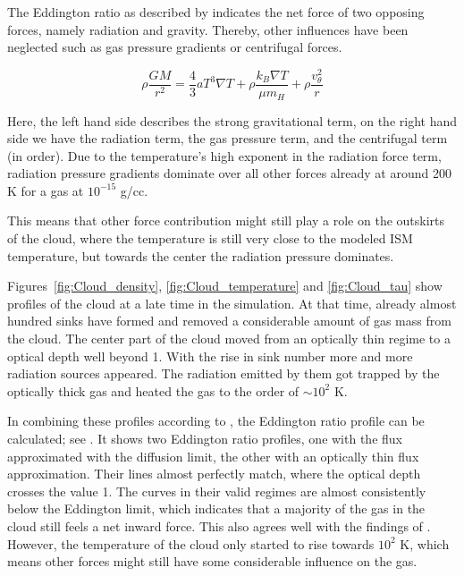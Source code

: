 The Eddington ratio as described by  indicates the net force of two opposing forces, namely radiation and gravity.
Thereby, other influences have been neglected such as gas pressure gradients or centrifugal forces.

\begin{equation}
  \rho \frac{GM}{r^{2}} = \frac{4}{3}a T^{3}\nabla T + \rho \frac{k_{B} \nabla T}{\mu m_{H}} + \rho \frac{v_{\theta}^{2}}{r}
\end{equation}

Here, the left hand side describes the strong gravitational term, on the right hand side we have the radiation term, the gas pressure term, and the centrifugal term (in order).
Due to the temperature's high exponent in the radiation force term, radiation pressure gradients dominate over all other forces already at around 200 K for a gas at $10^{-15}$ g/cc.

This means that other force contribution might still play a role on the outskirts of the cloud, where the temperature is still very close to the modeled ISM temperature, but towards the center the radiation pressure dominates.

Figures~\ref{fig:Cloud_density}, \ref{fig:Cloud_temperature} and \ref{fig:Cloud_tau} show profiles of the cloud at a late time in the simulation.
At that time, already almost hundred sinks have formed and removed a considerable amount of gas mass from the cloud.
The center part of the cloud moved from an optically thin regime to a optical depth well beyond 1.
With the rise in sink number more and more radiation sources appeared.
The radiation emitted by them got trapped by the optically thick gas and heated the gas to the order of $\sim10^{2}$ K.

In combining these profiles according to , the Eddington ratio profile can be calculated; see .
It shows two Eddington ratio profiles, one with the flux approximated with the diffusion limit, the other with an optically thin flux approximation.
Their lines almost perfectly match, where the optical depth crosses the value 1.
The curves in their valid regimes are almost consistently below the Eddington limit, which indicates that a majority of the gas in the cloud still feels a net inward force.
This also agrees well with the findings of \citet{Skinner_Ostriker}.
However, the temperature of the cloud only started to rise towards $10^{2}$ K, which means other forces might still have some considerable influence on the gas.

